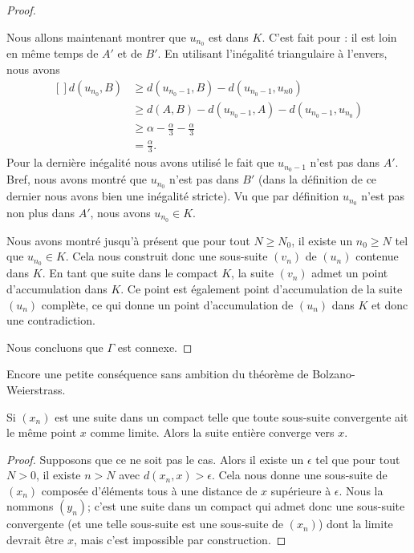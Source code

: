 \begin{proof}
\begin{subproof}
		Nous allons maintenant montrer que \( u_{n_0}\) est dans \( K\). C'est fait pour : il est loin en même temps de \( A'\) et de \( B'\). En utilisant l'inégalité triangulaire à l'envers, nous avons
		\begin{equation}
			\begin{aligned}[]
				d(u_{n_0},B) & \geq d(u_{n_0-1},B)-d(u_{n_0-1},u_{n0})               \\
				             & \geq d(A,B)-d(u_{n_0-1},A)-d(u_{n_0-1},u_{n_0})       \\
				             & \geq \alpha-\frac{ \alpha }{ 3 }-\frac{ \alpha }{ 3 } \\
				             & =\frac{ \alpha }{ 3 }.
			\end{aligned}
		\end{equation}
		Pour la dernière inégalité nous avons utilisé le fait que \( u_{n_0-1}\) n'est pas dans \( A'\). Bref, nous avons montré que \( u_{n_0}\) n'est pas dans \( B'\) (dans la définition de ce dernier nous avons bien une inégalité stricte). Vu que par définition \( u_{n_0}\) n'est pas non plus dans \( A'\), nous avons \( u_{n_0}\in K\).

		Nous avons montré jusqu'à présent que pour tout \( N\geq N_0\), il existe un \( n_0\geq N\) tel que \( u_{n_0}\in K\). Cela nous construit donc une sous-suite \( (v_n)\) de \( (u_n)\) contenue dans \( K\). En tant que suite dans le compact \( K\), la suite \( (v_n)\) admet un point d'accumulation dans \( K\). Ce point est également point d'accumulation de la suite \( (u_n)\) complète, ce qui donne un point d'accumulation de \( (u_n)\) dans \( K\) et donc une contradiction.

	\end{subproof}
	Nous concluons que \( \Gamma\) est connexe.
\end{proof}

Encore une petite conséquence sans ambition du théorème de Bolzano-Weierstrass.
\begin{proposition}\label{PropHNylIAW}
	Si \( (x_n)\) est une suite dans un compact telle que toute sous-suite convergente ait le même point \( x\) comme limite. Alors la suite entière converge vers \( x\).
\end{proposition}

\begin{proof}
	Supposons que ce ne soit pas le cas. Alors il existe un \( \epsilon\) tel que pour tout \( N>0\), il existe \( n>N\) avec \( d(x_n,x)>\epsilon\). Cela nous donne une sous-suite de \( (x_n)\) composée d'éléments tous à une distance de \( x\) supérieure à \( \epsilon\). Nous la nommons \( (y_n)\); c'est une suite dans un compact qui admet donc une sous-suite convergente (et une telle sous-suite est une sous-suite de \( (x_n)\)) dont la limite devrait être \( x\), mais c'est impossible par construction.
\end{proof}

